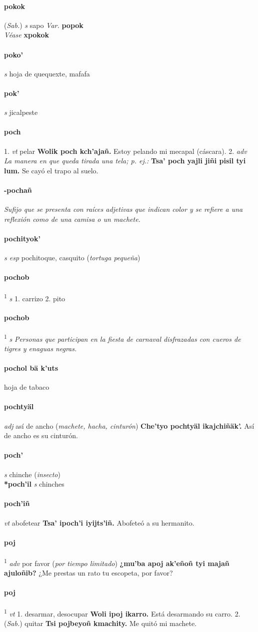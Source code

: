 \documentclass{scrbook}
\newcommand{\entry}[1]{\paragraph{#1}}
\newcommand{\onedefinition}[1]{#1.}
\newcommand{\defsuperscript}[1]{\textsuperscript{1}}
\newcommand{\nontranslationdef}[1]{\textit{#1}}
\newcommand{\partofspeech}[1]{\textit{#1}}
\newcommand{\spanishtranslation}[1]{#1}
\newcommand{\clarification}[1]{(\textit{#1})}
\newcommand{\cholexample}[1]{\textbf{#1}}
\newcommand{\exampletranslation}[1]{#1}
\newcommand{\alsosee}[1]{\\\textit{Véase} \textbf{#1}}
\newcommand{\relevantdialect}[1]{(\textit{#1})}
\newcommand{\secondaryentry}[1]{\\\textbf{#1}}
\newcommand{\secondpartofspeech}[1]{\textit{#1}}
\newcommand{\secondtranslation}[1]{#1}
\newcommand{\variation}[1]{\textit{Var.} \textbf{#1}}
\begin{document}
\begin{multicols}{2}
\entry{pokok}
\relevantdialect{Sab.}
\partofspeech{s}
\spanishtranslation{sapo}
\variation{popok}
\alsosee{xpokok}

\entry{poko'}
\partofspeech{s}
\spanishtranslation{hoja de quequexte, mafafa}

\entry{pok'}
\partofspeech{s}
\spanishtranslation{jicalpeste}

\entry{poch}
\onedefinition{1}
\partofspeech{vt}
\spanishtranslation{pelar}
\cholexample{Wolik poch kch'ajañ.}
\exampletranslation{Estoy pelando mi mecapal (cáscara).}
\onedefinition{2}
\partofspeech{adv}
\nontranslationdef{La manera en que queda tirada una tela; p. ej.:}
\cholexample{Tsa' poch yajli jiñi pisil tyi lum.}
\exampletranslation{Se cayó el trapo al suelo.}

\entry{-pochañ}
\nontranslationdef{Sufijo que se presenta con raíces adjetivas que indican color y se refiere a una reflexión como de una camisa o un machete.}

\entry{pochityok'}
\partofspeech{s esp}
\spanishtranslation{pochitoque, casquito}
\clarification{tortuga pequeña}

\entry{pochob}
\defsuperscript{1}
\partofspeech{s}
\onedefinition{1}
\spanishtranslation{carrizo}
\onedefinition{2}
\spanishtranslation{pito}

\entry{pochob}
\defsuperscript{2}
\partofspeech{s}
\nontranslationdef{Personas que participan en la fiesta de carnaval disfrazadas con cueros de tigres y enaguas negras.}

\entry{pochol bä k'uts}
\spanishtranslation{hoja de tabaco}

\entry{pochtyäl}
\partofspeech{adj}
\spanishtranslation{así de ancho}
\clarification{machete, hacha, cinturón}
\cholexample{Che'tyo pochtyäl ikajchiñäk'.}
\exampletranslation{Así de ancho es su cinturón.}

\entry{poch'}
\partofspeech{s}
\spanishtranslation{chinche}
\clarification{insecto}
\secondaryentry{*poch'il}
\secondpartofspeech{s}
\secondtranslation{chinches}

\entry{poch'iñ}
\partofspeech{vt}
\spanishtranslation{abofetear}
\cholexample{Tsa' ipoch'i iyijts'iñ.}
\exampletranslation{Abofeteó a su hermanito.}

\entry{poj}
\defsuperscript{1}
\partofspeech{adv}
\spanishtranslation{por favor}
\clarification{por tiempo limitado}
\cholexample{¿mu'ba apoj ak'eñoñ tyi majañ ajuloñib?}
\exampletranslation{¿Me prestas un rato tu escopeta, por favor?}

\entry{poj}
\defsuperscript{2}
\partofspeech{vt}
\onedefinition{1}
\spanishtranslation{desarmar, desocupar}
\cholexample{Woli ipoj ikarro.}
\exampletranslation{Está desarmando su carro.}
\onedefinition{2}
\relevantdialect{Sab.}
\spanishtranslation{quitar}
\cholexample{Tsi pojbeyoñ kmachity.}
\exampletranslation{Me quitó mi machete.}


\end{multicols}
\end{document}
